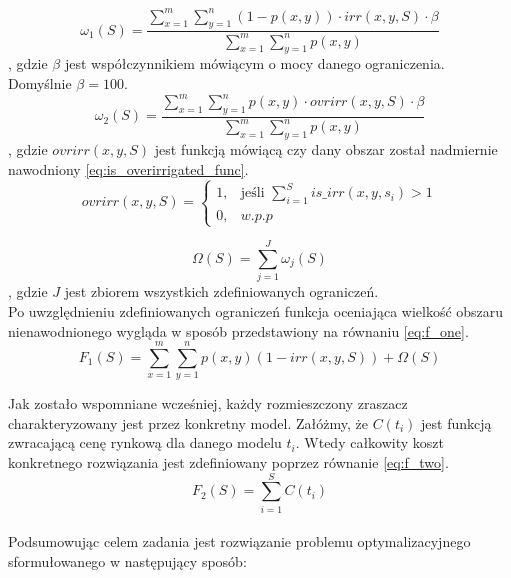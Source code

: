 \documentclass[twoside]{iisthesis}
\begin{document}
\begin{equation}\label{eq:constraint_out_of_bounds}
	\omega_{1}(S) = \dfrac{\sum_{x=1}^{m}\sum_{y=1}^{n} (1 - p(x,y)) \cdot irr(x,y,S) \cdot \beta}{\sum_{x=1}^{m}\sum_{y=1}^{n} p(x,y)}
\end{equation}
, gdzie $\beta$ jest współczynnikiem mówiącym o mocy danego ograniczenia. Domyślnie $\beta=100$.\\
\begin{equation}\label{eq:constraint_overrirr}
	\omega_{2}(S) = \dfrac{\sum_{x=1}^{m}\sum_{y=1}^{n} p(x,y) \cdot ovrirr(x,y,S) \cdot \beta}{\sum_{x=1}^{m}\sum_{y=1}^{n} p(x,y)}
\end{equation}
, gdzie $ovrirr(x,y,S)$ jest funkcją mówiącą czy dany obszar został nadmiernie nawodniony \eqref{eq:is_overirrigated_func}.\\
\begin{equation}\label{eq:is_overirrigated_func}
	ovrirr(x,y,S) = \begin{cases}
				1,& \text{jeśli } \sum_{i=1}^{S} is\_irr(x,y,s_{i}) > 1 \\
				0,& w.p.p
			   \end{cases}
\end{equation}

\begin{equation}\label{eq:constraint_sum}
	\Omega(S) = \sum_{j = 1}^{J} \omega_{j}(S)
\end{equation}
, gdzie $J$ jest zbiorem wszystkich zdefiniowanych ograniczeń.\\

Po uwzględnieniu zdefiniowanych ograniczeń funkcja oceniająca wielkość obszaru nienawodnionego wygląda w sposób przedstawiony na równaniu \eqref{eq:f_one}.
\begin{equation}\label{eq:f_one}
F_{1}(S) = \sum_{x=1}^{m}\sum_{y=1}^{n} p(x,y)(1 - irr(x,y,S)) + \Omega(S)
\end{equation}

Jak zostało wspomniane wcześniej, każdy rozmieszczony zraszacz charakteryzowany jest przez konkretny model. Załóżmy, że $C(t_{i})$ jest funkcją zwracającą cenę rynkową dla danego modelu $t_i$. Wtedy całkowity koszt konkretnego rozwiązania jest zdefiniowany poprzez równanie \eqref{eq:f_two}.
\begin{equation}\label{eq:f_two}
	F_{2}(S) = \sum_{i=1}^{S} C(t_{i})
\end{equation}\\

Podsumowując celem zadania jest rozwiązanie problemu optymalizacyjnego sformułowanego w następujący sposób:\\
\end{document}
